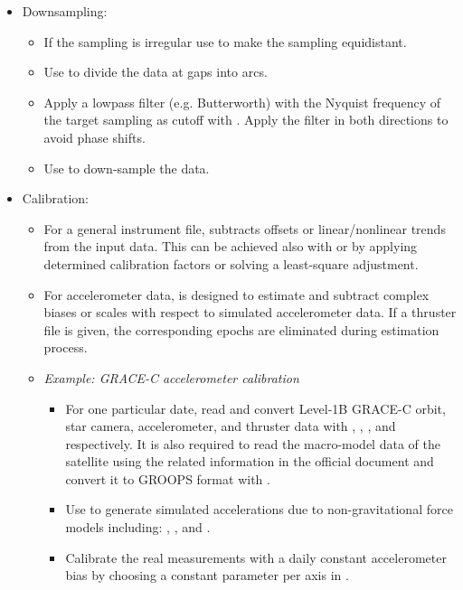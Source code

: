 \begin{itemize}
\item Downsampling:
  \begin{itemize}
  \item If the sampling is irregular use  to make the sampling equidistant.
  \item Use  to divide the data at gaps into arcs.
  \item Apply a lowpass filter (e.g. Butterworth) with the Nyquist frequency of the target sampling as cutoff with . Apply the filter in both directions to avoid phase shifts.
  \item Use  to down-sample the data.
  \end{itemize}

\item Calibration:
  \begin{itemize}
  \item For a general instrument file,  subtracts offsets or linear/nonlinear trends from the input data. This can be achieved also with  or  by applying determined calibration factors or solving a least-square adjustment.
  \item For accelerometer data,  is designed to estimate and subtract complex biases or scales with respect to simulated accelerometer data. If a thruster file is given, the corresponding epochs are eliminated during estimation process.
  \item \emph{Example: GRACE-C accelerometer calibration}
  \begin{itemize}
  \item For one particular date, read and convert Level-1B GRACE-C orbit, star camera, accelerometer, and thruster data with , , , and  respectively. It is also required to read the macro-model data of the satellite using the related information in the official document and convert it to GROOPS format with .
  \item Use  to generate simulated accelerations due to non-gravitational force models including: , , and .
  \item Calibrate the real measurements with a daily constant accelerometer bias by choosing a constant parameter per axis in .
  \end{itemize}
  \end{itemize}
\end{itemize}

